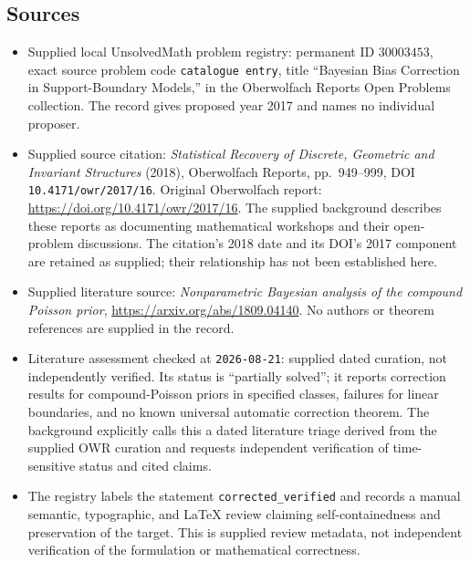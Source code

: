 \documentclass[11pt]{article}
\begin{document}
\subsection{Sources}
\begin{itemize}
\item Supplied local UnsolvedMath problem registry: permanent ID \(30003453\), exact source problem code \texttt{catalogue entry}, title ``Bayesian Bias Correction in Support-Boundary Models,'' in the Oberwolfach Reports Open Problems collection. The record gives proposed year 2017 and names no individual proposer.
\item Supplied source citation: \emph{Statistical Recovery of Discrete, Geometric and Invariant Structures} (2018), Oberwolfach Reports, pp.\ 949--999, DOI \texttt{10.4171/owr/2017/16}. Original Oberwolfach report: \url{https://doi.org/10.4171/owr/2017/16}. The supplied background describes these reports as documenting mathematical workshops and their open-problem discussions. The citation's 2018 date and its DOI's 2017 component are retained as supplied; their relationship has not been established here.
\item Supplied literature source: \emph{Nonparametric Bayesian analysis of the compound Poisson prior}, \url{https://arxiv.org/abs/1809.04140}. No authors or theorem references are supplied in the record.
\item Literature assessment checked at \texttt{2026-08-21}: supplied dated curation, not independently verified. Its status is ``partially solved''; it reports correction results for compound-Poisson priors in specified classes, failures for linear boundaries, and no known universal automatic correction theorem. The background explicitly calls this a dated literature triage derived from the supplied OWR curation and requests independent verification of time-sensitive status and cited claims.
\item The registry labels the statement \texttt{corrected\_verified} and records a manual semantic, typographic, and LaTeX review claiming self-containedness and preservation of the target. This is supplied review metadata, not independent verification of the formulation or mathematical correctness.
\end{itemize}
\end{document}
